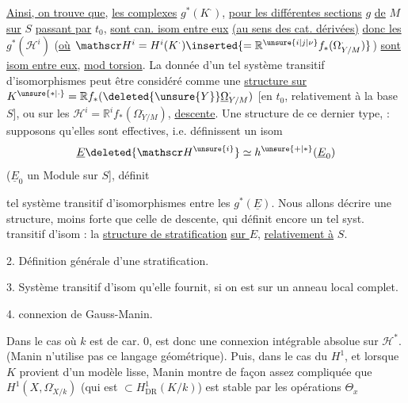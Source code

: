 \uline{Ainsi, on trouve que},  \uline{les complexes} $g^*(K^{\cdot})$, \uline{pour les différentes sections} $g$ \uline{de} $M$ \uline{sur} $S$ \uline{passant par} $t_0$, \uline{sont can. isom entre eux} \uline{(au sens des cat. dérivées)} \uline{donc les} $g^*(\mathscr H^i)$ (\uline{où} $\mathscr H^i=H^i(K^{\cdot})\inserted{=\mathbb R^{\unsure{i|j|\nu}}f_*(\Omega^{\cdot}_{Y/M})}$) \uline{sont  isom entre eux},  \uline{mod torsion}. La donnée d'un tel système transitif d'isomorphismes peut être considéré comme une \uline{structure  sur} $K^{\unsure{*|\cdot}}=\mathbb R f_*(\deleted{\unsure{Y}}\underline{\Omega}^{\cdot}_{Y/M})$ [en  $t_0$, relativement à la base $S$], ou sur les $\mathscr H^i=\mathbb R^i f_*(\Omega^{\cdot}_{Y/M})$,   \uline{descente}. Une structure de  ce dernier type,  : supposons qu'elles sont effectives, i.e. définissent un isom
\[
\underline E\deleted{\mathscr H^{\unsure{i}}}\simeq h^{\unsure{+|*}}(\underline E_0)
\]
($\underline E_0$ un Module sur $S$], définit 

tel système transitif d'isomorphismes entre les $g^*(\underline E)$. Nous allons décrire une structure,  moins forte que celle de descente, qui définit encore un tel syst. transitif d'isom : la \uline{structure de stratification} \uline{sur $E$}, \uline{relativement à} $S$.

2. Définition générale d'une stratification. 

3. Système transitif d'isom qu'elle fournit, si on est sur un anneau local complet.

4.   connexion de Gauss-Manin.

Dans le cas où $k$ est de car. $0$,  est donc une connexion intégrable absolue sur $\mathscr H^*$. (Manin n'utilise pas ce langage géométrique). Puis, dans le cas du $H^1$, et lorsque $K$  provient d'un modèle  lisse, Manin montre de façon assez compliquée que $H^1(X,\Omega^{\cdot}_{X/k})$ (qui est $\subset H^1_{\mathrm{DR}}(K/k)$) est stable par les opérations $\Theta_x$

